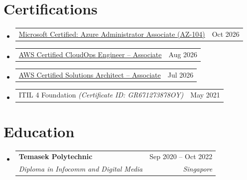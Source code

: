 \documentclass[a4paper,10pt]{article}
\makeatletter
\newcommand{\resumeSubheading}[4]{
  \needspace{8\baselineskip}\vspace{-2pt}\item
    \begin{tabular*}{0.97\textwidth}[t]{l@{\extracolsep{\fill}}r}
      \textbf{#1} & #2 \\
      \textit{\small#3} & \textit{\small #4} \\
    \end{tabular*}\vspace{-7pt}
}
\newcommand{\resumeCertItem}[2]{
  \item
    \begin{tabularx}{0.97\textwidth}[t]{@{}>{\raggedright\arraybackslash}X@{}r@{}}
      \small #1 & \small #2 \\
    \end{tabularx}\vspace{-6pt}
}
\newcommand{\resumeSubHeadingListStart}{\begin{itemize}[leftmargin=0.15in, label={}]}
\newcommand{\resumeSubHeadingListEnd}{\end{itemize}}
\newcommand{\resumeItemListEnd}{\end{itemize}\vspace{-5pt}}
\makeatother
\begin{document}
\section{Certifications}
  \resumeSubHeadingListStart
    \resumeCertItem{\href{https://learn.microsoft.com/en-sg/users/yiktattong-4161/credentials/2f92fdf4519b60ad}{Microsoft Certified: Azure Administrator Associate (AZ-104)}}{Oct 2026}
    \resumeCertItem{\href{https://www.credly.com/badges/209df12d-e120-4509-ad16-6c4d6fa05ca8/linked_in_profile}{AWS Certified CloudOps Engineer -- Associate}}{Aug 2026}
    \resumeCertItem{\href{https://www.credly.com/badges/b03143a4-ab95-45ea-93f4-068addd79ec6/linked_in_profile}{AWS Certified Solutions Architect -- Associate}}{Jul 2026}
    \resumeCertItem{ITIL 4 Foundation \textit{(Certificate ID: GR671273878OY)}}{May 2021}
  \resumeSubHeadingListEnd
\vspace{6pt}
\section{Education}
  \resumeSubHeadingListStart
    \resumeSubheading
      {Temasek Polytechnic}{Sep 2020 -- Oct 2022}
      {Diploma in Infocomm and Digital Media}{Singapore}
  \resumeSubHeadingListEnd
\end{document}
